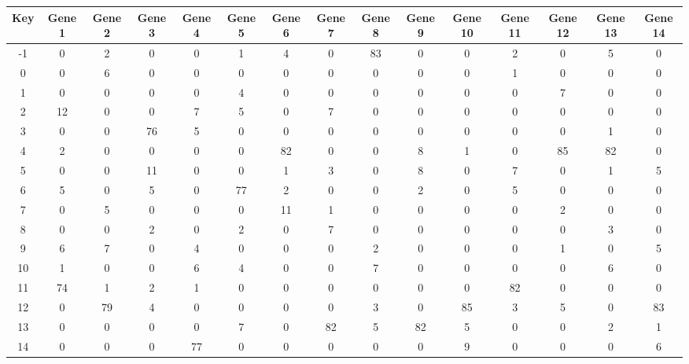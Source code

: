 \begin{tabular}{|c|c|c|c|c|c|c|c|c|c|c|c|c|c|c|}
\hline
Key & Gene 1 & Gene 2 & Gene 3 & Gene 4 & Gene 5 & Gene 6 & Gene 7 & Gene 8 & Gene 9 & Gene 10 & Gene 11 & Gene 12 & Gene 13 & Gene 14 \\
\hline
-1 & 0 & 2 & 0 & 0 & 1 & 4 & 0 & 83 & 0 & 0 & 2 & 0 & 5 & 0 \\
0 & 0 & 6 & 0 & 0 & 0 & 0 & 0 & 0 & 0 & 0 & 1 & 0 & 0 & 0 \\
1 & 0 & 0 & 0 & 0 & 4 & 0 & 0 & 0 & 0 & 0 & 0 & 7 & 0 & 0 \\
2 & 12 & 0 & 0 & 7 & 5 & 0 & 7 & 0 & 0 & 0 & 0 & 0 & 0 & 0 \\
3 & 0 & 0 & 76 & 5 & 0 & 0 & 0 & 0 & 0 & 0 & 0 & 0 & 1 & 0 \\
4 & 2 & 0 & 0 & 0 & 0 & 82 & 0 & 0 & 8 & 1 & 0 & 85 & 82 & 0 \\
5 & 0 & 0 & 11 & 0 & 0 & 1 & 3 & 0 & 8 & 0 & 7 & 0 & 1 & 5 \\
6 & 5 & 0 & 5 & 0 & 77 & 2 & 0 & 0 & 2 & 0 & 5 & 0 & 0 & 0 \\
7 & 0 & 5 & 0 & 0 & 0 & 11 & 1 & 0 & 0 & 0 & 0 & 2 & 0 & 0 \\
8 & 0 & 0 & 2 & 0 & 2 & 0 & 7 & 0 & 0 & 0 & 0 & 0 & 3 & 0 \\
9 & 6 & 7 & 0 & 4 & 0 & 0 & 0 & 2 & 0 & 0 & 0 & 1 & 0 & 5 \\
10 & 1 & 0 & 0 & 6 & 4 & 0 & 0 & 7 & 0 & 0 & 0 & 0 & 6 & 0 \\
11 & 74 & 1 & 2 & 1 & 0 & 0 & 0 & 0 & 0 & 0 & 82 & 0 & 0 & 0 \\
12 & 0 & 79 & 4 & 0 & 0 & 0 & 0 & 3 & 0 & 85 & 3 & 5 & 0 & 83 \\
13 & 0 & 0 & 0 & 0 & 7 & 0 & 82 & 5 & 82 & 5 & 0 & 0 & 2 & 1 \\
14 & 0 & 0 & 0 & 77 & 0 & 0 & 0 & 0 & 0 & 9 & 0 & 0 & 0 & 6 \\
\hline
\end{tabular}